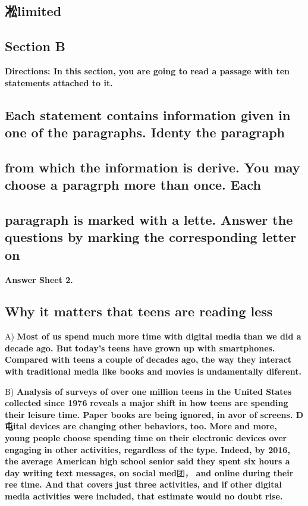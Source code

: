 \documentclass[UTF8,11pt]{ctexart}
\begin{document}
\subsection*{凇\textbf{limited}}


\subsection*{\textbf{Section B}}


\textbf{Directions: In this section, you are going to read a passage with ten statements attached to it.}


\subsection*{\textbf{Each statement contains information given in one of the paragraphs. Identy the paragraph}}


\subsection*{\textbf{from which the information is derive. You may choose a paragrph more than once. Each}}


\subsection*{\textbf{paragraph is marked with a lette. Answer the questions by marking the corresponding letter on}}


\textbf{Answer Sheet 2.}


\subsection*{\textbf{Why it matters that teens are reading less}}


A) \textbf{Most of us spend much more time with digital media than we did a decade ago. But} \textbf{today's teens have grown up with smartphones. Compared with teens a couple of} \textbf{decades ago, the way they interact with traditional media like books and movies is} \textbf{undamentally diferent.}


B) \textbf{Analysis of surveys of over one million teens in the United States collected since 1976} \textbf{reveals a major shift in how teens are spending their leisure time. Paper books are being} \textbf{ignored, in avor of screens. D屯ital devices are changing other behaviors, too. More} \textbf{and more, young people choose spending time on their electronic devices over engaging} \textbf{in other activities, regardless of the type. Indeed, by 2016, the average American high} \textbf{school senior said they spent six hours a day writing text messages, on social med}团， \textbf{and online during their ree time. And that covers just three activities, and if other} \textbf{digital media activities were included, that estimate would no doubt rise.}
\end{document}
